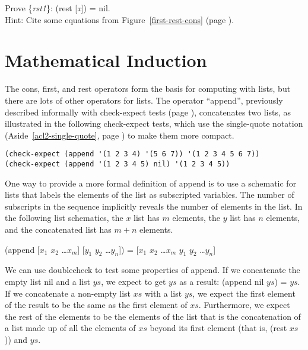 \begin{ExerciseList}
\Exercise \label{rst1}
Prove \{\emph{rst1}\}: (rest [\emph{x}]) = nil.\\
Hint: Cite some equations from Figure~\ref{first-rest-cons} (page \pageref{first-rest-cons}).
\end{ExerciseList}

\section{Mathematical Induction}
\label{sec:induction}
The cons, first, and rest operators form the basis for computing with lists,
but there are lots of other operators for lists.
The operator ``append'', previously described informally with check-expect tests
(page \pageref{append-op-informal}), concatenates two lists, as illustrated
in the following check-expect tests,
which use the single-quote notation (Aside~\ref{acl2-single-quote}, page \pageref{acl2-single-quote})
to make them more compact.

\begin{Verbatim}
(check-expect (append '(1 2 3 4) '(5 6 7)) '(1 2 3 4 5 6 7))
(check-expect (append '(1 2 3 4 5) nil) '(1 2 3 4 5))
\end{Verbatim}

One way to provide a more formal definition of append is
to use a schematic for lists
that labels the elements of the list as subscripted variables.
The number of subscripts in the sequence implicitly reveals the number of elements in the list.
\label{list-schematic} In the following list schematics,
the $x$ list has $m$ elements, the $y$ list has $n$ elements,
and the concatenated list has $m+n$ elements.
\begin{samepage}
\begin{center}
(append [$x_1$ $x_2$ \dots $x_m$] [$y_1$ $y_2$ \dots $y_n$]) = [$x_1$ $x_2$ \dots $x_m$ $y_1$ $y_2$ \dots $y_n$]
\end{center}
\end{samepage}

We can use doublecheck to test some properties of append.
If we concatenate the empty list nil and a list $ys$,
we expect to get $ys$ as a result: (append nil $ys$) = $ys$.
If we concatenate a non-empty list $xs$ with a list $ys$,
we expect the first element of the result to be the same as
the first element of $xs$.
Furthermore, we expect the rest of the elements to be
the elements of the list that is the concatenation of
a list made up of all the elements of $xs$ beyond its first element
(that is, (rest $xs$)) and $ys$.

